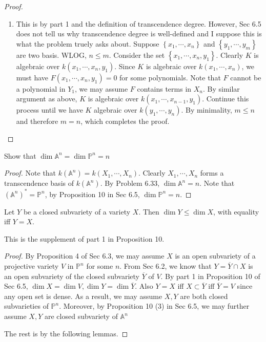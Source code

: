 \documentclass{solution}
\begin{document}
\begin{proof}
\begin{enumerate}
        \item This is by part 1 and the definition of transcendence degree. However, Sec 6.5 does not tell us why transcendence degree is well-defined and I suppose this is what the problem truely asks about. Suppose $\left\lbrace x_1, \cdots, x_n \right\rbrace$ and $\left\lbrace y_1, \cdots, y_m \right\rbrace$ are two basis. WLOG, $n \le m$. Consider the set $\left\lbrace x_1, \cdots, x_n, y_1 \right\rbrace$. Clearly $K$ is algebraic over $k(x_1, \cdots, x_n, y_1)$. Since $K$ is algebraic over $k(x_1, \cdots, x_n)$, we must have $F(x_1, \cdots, x_n, y_1) = 0$ for some polynomials. Note that $F$ cannot be a polynomial in $Y_1$, we may assume $F$ contains terms in $X_n$. By similar argument as above, $K$ is algebraic over $k(x_1, \cdots, x_{n - 1}, y_1)$. Continue this process until we have $K$ algebraic over $k(y_1, \cdots, y_n)$. By minimality, $m \le n$ and therefore $m = n$, which completes the proof.
    \end{enumerate}
\end{proof}

\begin{problem}{6.34}
    Show that $\dim \mathbb{A}^n = \dim \mathbb{P}^n = n$
\end{problem}

\begin{proof}
    Note that $k(\mathbb{A}^n) = k(X_1, \cdots, X_n)$. Clearly $X_1, \cdots, X_n$ forms a transcendence basis of $k(\mathbb{A}^n)$. By Problem 6.33, $\dim \mathbb{A}^n = n$. Note that $(\mathbb{A}^n)^* = \mathbb{P}^n$, by Proposition 10 in Sec 6.5, $\dim \mathbb{P}^n = n$.
\end{proof}

\begin{problem}{6.35}
    Let $Y$ be a closed subvariety of a variety $X$. Then $\dim Y \le \dim X$, with equality iff $Y = X$.
\end{problem}

This is the supplement of part 1 in Proposition 10.

\begin{proof}
    By Proposition 4 of Sec 6.3, we may assume $X$ is an open subvariety of a projective variety $V$ in $\mathbb{P}^n$ for some $n$. From Sec 6.2, we know that $Y = \overline{Y} \cap X$ is an open subvariety of the closed subvariety $\overline{Y}$ of $V$. By part 1 in Proposition 10 of Sec 6.5, $\dim X = \dim V, \dim Y = \dim \overline{Y}$. Also $Y = X$ iff $X \subset \overline{Y}$ iff $\overline{Y} = V$ since any open set is dense. As a result, we may assume $X, Y$ are both closed subvarieties of $\mathbb{P}^n$. Moreover, by Proposition 10 (3) in Sec 6.5, we may further assume $X, Y$ are closed subvariety of $\mathbb{A}^n$

    The rest is by the following lemmas.
\end{proof}
\end{document}
